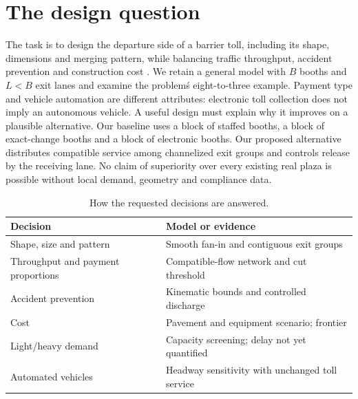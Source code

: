 \documentclass[12pt,letterpaper]{article}
\begin{document}
\section{The design question}
The task is to design the departure side of a barrier toll, including its shape, dimensions and merging pattern, while balancing traffic throughput, accident prevention and construction cost \cite{comap}. We retain a general model with $B$ booths and $L<B$ exit lanes and examine the problem\'s eight-to-three example. Payment type and vehicle automation are different attributes: electronic toll collection does not imply an autonomous vehicle.
A useful design must explain why it improves on a plausible alternative. Our baseline uses a block of staffed booths, a block of exact-change booths and a block of electronic booths. Our proposed alternative distributes compatible service among channelized exit groups and controls release by the receiving lane. No claim of superiority over every existing real plaza is possible without local demand, geometry and compliance data.
\begin{table}[htbp]\centering\small\caption{How the requested decisions are answered.}\begin{tabular}{@{}p{.32\linewidth}p{.61\linewidth}@{}}\toprule
Decision & Model or evidence\\\midrule
Shape, size and pattern & Smooth fan-in and contiguous exit groups\\
Throughput and payment proportions & Compatible-flow network and cut threshold\\
Accident prevention & Kinematic bounds and controlled discharge\\
Cost & Pavement and equipment scenario; frontier\\
Light/heavy demand & Capacity screening; delay not yet quantified\\
Automated vehicles & Headway sensitivity with unchanged toll service\\
\bottomrule\end{tabular}\end{table}
\end{document}
